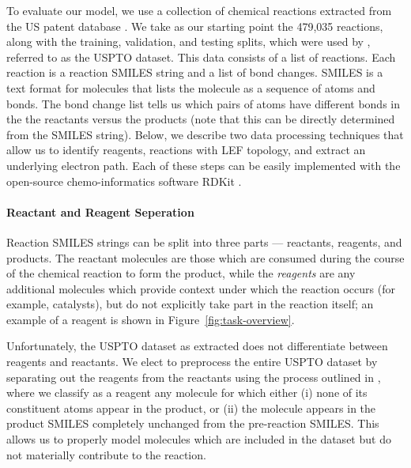 

To evaluate our model, we use a collection of chemical reactions extracted from the US patent database \citep{Lowe2017}.
We take as our starting point the 479,035 reactions, along with the training, validation, and testing splits, 
which were used by \citet{jin2017predicting}, referred to as the USPTO dataset.
This data consists of a list of reactions. Each reaction is a reaction SMILES string \citep{weininger1988smiles} and a list of bond changes.
SMILES is a text format for molecules that lists the molecule as a sequence of atoms and bonds.
The bond change list tells us which pairs of atoms have different bonds in the the reactants versus the products (note that this can be directly determined from the SMILES string).
Below, we describe two data processing techniques that allow us to identify reagents, reactions with LEF topology, and extract an underlying electron path. Each of these steps can be easily implemented with the open-source chemo-informatics software RDKit \citep{rdkit}.

 
\paragraph{Reactant and Reagent Seperation}
Reaction SMILES strings can be split into three parts --- reactants, reagents, and products.
The reactant molecules are those which are consumed during the course of the chemical reaction to form the product, 
while the {\em reagents} are any additional molecules which provide context under which the reaction occurs (for example, catalysts),
but do not explicitly take part in the reaction itself; an example of a reagent is shown in Figure~\ref{fig:task-overview}.


Unfortunately, the USPTO dataset as extracted does not differentiate between reagents and reactants.
We elect to preprocess the entire USPTO dataset by separating out the reagents from the reactants using the process outlined in \citet{schwaller2017found}, where we classify as a reagent any molecule for which either 
(i) none of its constituent atoms appear in the product, or 
(ii) the molecule appears in the product SMILES completely unchanged from the pre-reaction SMILES.
This allows us to properly model molecules which are included in the dataset but do not materially contribute to the reaction.

